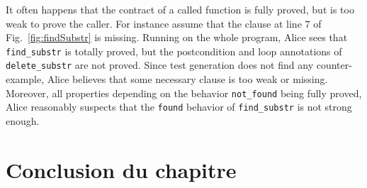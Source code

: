 It often happens that the contract of a called function is
fully proved, but is too weak to prove the caller.
For instance assume that the clause at line 7 of Fig.~\ref{fig:findSubstr} is
missing. Running \Wp on the whole program, Alice sees that
\lstinline{find_substr} is totally proved, but the postcondition and loop
annotations of \lstinline{delete_substr} are not proved. Since test generation
does not find any counter-example, Alice believes that some necessary clause is
too weak or missing.
Moreover, all properties depending on the behavior \lstinline{not_found} being
fully proved, Alice reasonably suspects that the \lstinline{found} behavior of
\lstinline{find_substr} is not strong enough.


\section*{Conclusion du chapitre}

